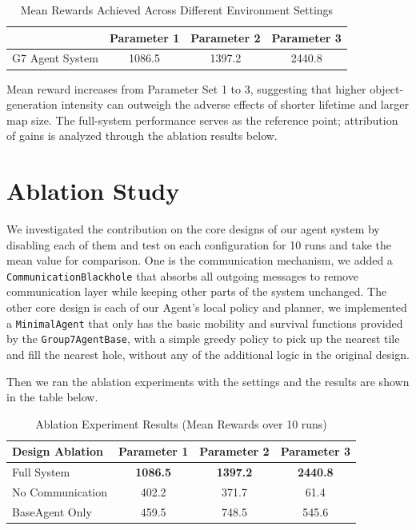 \documentclass{article}
\begin{document}
\begin{table}[ht]
    \centering
    \begin{tabular}{lccc}
        \toprule
            & Parameter 1 & Parameter 2 & Parameter 3 \\
        \midrule
        G7 Agent System & 1086.5 & 1397.2 & 2440.8 \\
        \bottomrule
    \end{tabular}
    \caption{Mean Rewards Achieved Across Different Environment Settings}
    \label{results}
\end{table}

Mean reward increases from Parameter Set 1 to 3, suggesting that higher object-generation intensity can outweigh the adverse effects of shorter lifetime and larger map size. The full-system performance serves as the reference point; attribution of gains is analyzed through the ablation results below.

\section{Ablation Study}

We investigated the contribution on the core designs of our agent system by disabling each of them and test on each configuration for 10 runs and take the mean value for comparison.
One is the communication mechanism, we added a \texttt{CommunicationBlackhole} that absorbs all outgoing messages to remove communication layer while keeping other parts of the system unchanged.
The other core design is each of our Agent's local policy and planner, we implemented a \texttt{MinimalAgent} that only has the basic mobility and survival functions provided by the \texttt{Group7AgentBase}, 
with a simple greedy policy to pick up the nearest tile and fill the nearest hole, without any of the additional logic in the original design.

Then we ran the ablation experiments with the settings and the results are shown in the table below.

\begin{table}[ht]
    \centering
    \begin{tabular}{lccc}
        \toprule
        Design Ablation & Parameter 1 & Parameter 2 & Parameter 3 \\
        \midrule
        Full System & \textbf{1086.5} & \textbf{1397.2} & \textbf{2440.8} \\
        No Communication & 402.2 & 371.7 & 61.4 \\
        BaseAgent Only & 459.5 & 748.5 & 545.6 \\
        \bottomrule
    \end{tabular}
    \caption{Ablation Experiment Results (Mean Rewards over 10 runs)}
    \label{ablation-study}
\end{table}
\end{document}
